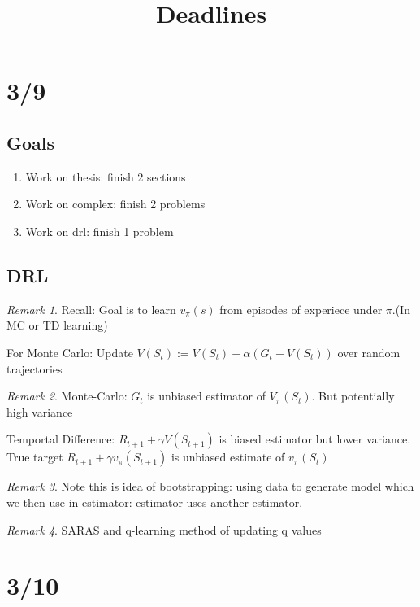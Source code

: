 \documentclass[11pt]{article}
\title{Deadlines}
\theoremstyle{remark}
\newtheorem{remark}{Remark}
\begin{document}
\maketitle

\section{3/9}

\subsection{Goals}

\begin{enumerate}
	\item Work on thesis: finish 2 sections
	\item Work on complex: finish 2 problems
	\item Work on drl: finish 1 problem
\end{enumerate}

\subsection{DRL}

\begin{remark}
	Recall: Goal is to learn $v_{\pi}(s)$ from episodes of experiece under $\pi$.(In MC or TD learning)

	For Monte Carlo: Update $V(S_t) := V(S_t) + \alpha(G_t -V(S_t))$ over random trajectories
\end{remark}

\begin{remark}
	Monte-Carlo: $G_t$ is unbiased estimator of $V_{\pi}(S_t)$. But potentially high variance

	Temportal Difference: $R_{t+1}+\gamma V(S_{t+1})$ is biased estimator but lower variance. True target $R_{t+1} + \gamma v_{\pi}(S_{t+1})$ is unbiased estimate of $v_{\pi}(S_t)$
\end{remark}

\begin{remark}
	Note this is idea of bootstrapping: using data to generate model which we then use in estimator: estimator uses another estimator.
\end{remark}

\begin{remark}
	SARAS and q-learning method of updating q values
\end{remark}

\section{3/10}
\end{document}
